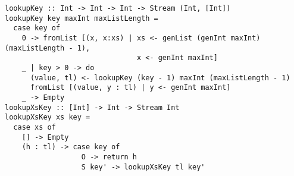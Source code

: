 \begin{figure*}[!t]
  \centering
  \begin{minipage}{\textwidth}
    \begin{lstlisting}[label={lookup}, caption={Functional implementations for a \lstinline{lookupo out in out} and \lstinline{lookupo in in out} directions}, captionpos=b, frame=tb]
lookupKey :: Int -> Int -> Int -> Stream (Int, [Int])
lookupKey key maxInt maxListLength =
  case key of
    0 -> fromList [(x, x:xs) | xs <- genList (genInt maxInt) (maxListLength - 1),
                               x <- genInt maxInt]
    _ | key > 0 -> do
      (value, tl) <- lookupKey (key - 1) maxInt (maxListLength - 1)
      fromList [(value, y : tl) | y <- genInt maxInt]
    _ -> Empty
lookupXsKey :: [Int] -> Int -> Stream Int
lookupXsKey xs key =
  case xs of
    [] -> Empty
    (h : tl) -> case key of
                  O -> return h
                  S key' -> lookupXsKey tl key'
    \end{lstlisting}
  \end{minipage}
\end{figure*}

